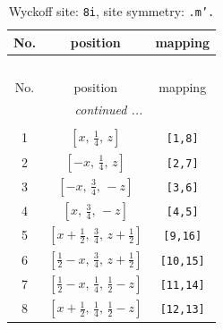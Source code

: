 \documentclass[fleqn,8pt]{jsarticle}
\begin{document}
\begin{longtable}{ccc}
\caption{Wyckoff site: {\tt 8i}, site symmetry: {\tt .m'.}}
 \\
 \hline \hline
No. & position & mapping \\ \hline \endfirsthead

\multicolumn{2}{l}{\tablename\ \thetable{}} \\
 \hline \hline
No. & position & mapping \\ \hline \endhead

 \hline \hline
\multicolumn{2}{r}{\footnotesize\it continued ...} \\ \endfoot

 \hline \hline
\multicolumn{2}{r}{} \\ \endlastfoot

1 & $\left[ x,\, \frac{1}{4},\, z \right]$ & {\tt [1,8]} \\ \hline
2 & $\left[ - x,\, \frac{1}{4},\, z \right]$ & {\tt [2,7]} \\ \hline
3 & $\left[ - x,\, \frac{3}{4},\, - z \right]$ & {\tt [3,6]} \\ \hline
4 & $\left[ x,\, \frac{3}{4},\, - z \right]$ & {\tt [4,5]} \\ \hline
5 & $\left[ x + \frac{1}{2},\, \frac{3}{4},\, z + \frac{1}{2} \right]$ & {\tt [9,16]} \\ \hline
6 & $\left[ \frac{1}{2} - x,\, \frac{3}{4},\, z + \frac{1}{2} \right]$ & {\tt [10,15]} \\ \hline
7 & $\left[ \frac{1}{2} - x,\, \frac{1}{4},\, \frac{1}{2} - z \right]$ & {\tt [11,14]} \\ \hline
8 & $\left[ x + \frac{1}{2},\, \frac{1}{4},\, \frac{1}{2} - z \right]$ & {\tt [12,13]} \\
\end{longtable}
\renewcommand{\arraystretch}{1.2}
\end{document}
